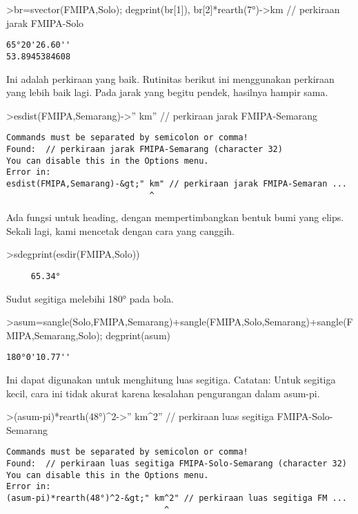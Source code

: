 \documentclass[
]{book}
\begin{document}
\textgreater br=svector(FMIPA,Solo); degprint(br{[}1{]}), br{[}2{]}*rearth(7°)-\textgreater km // perkiraan jarak FMIPA-Solo

\begin{verbatim}
65°20'26.60''
53.8945384608
\end{verbatim}

Ini adalah perkiraan yang baik. Rutinitas berikut ini menggunakan perkiraan yang lebih baik lagi. Pada jarak yang begitu pendek, hasilnya hampir sama.

\textgreater esdist(FMIPA,Semarang)-\textgreater'' km'' // perkiraan jarak FMIPA-Semarang

\begin{verbatim}
Commands must be separated by semicolon or comma!
Found:  // perkiraan jarak FMIPA-Semarang (character 32)
You can disable this in the Options menu.
Error in:
esdist(FMIPA,Semarang)-&gt;" km" // perkiraan jarak FMIPA-Semaran ...
                             ^
\end{verbatim}

Ada fungsi untuk heading, dengan mempertimbangkan bentuk bumi yang elips. Sekali lagi, kami mencetak dengan cara yang canggih.

\textgreater sdegprint(esdir(FMIPA,Solo))

\begin{verbatim}
     65.34°
\end{verbatim}

Sudut segitiga melebihi 180° pada bola.

\textgreater asum=sangle(Solo,FMIPA,Semarang)+sangle(FMIPA,Solo,Semarang)+sangle(FMIPA,Semarang,Solo); degprint(asum)

\begin{verbatim}
180°0'10.77''
\end{verbatim}

Ini dapat digunakan untuk menghitung luas segitiga. Catatan: Untuk segitiga kecil, cara ini tidak akurat karena kesalahan pengurangan dalam asum-pi.

\textgreater(asum-pi)*rearth(48°)\^{}2-\textgreater'' km\^{}2'' // perkiraan luas segitiga FMIPA-Solo-Semarang

\begin{verbatim}
Commands must be separated by semicolon or comma!
Found:  // perkiraan luas segitiga FMIPA-Solo-Semarang (character 32)
You can disable this in the Options menu.
Error in:
(asum-pi)*rearth(48°)^2-&gt;" km^2" // perkiraan luas segitiga FM ...
                                ^
\end{verbatim}
\end{document}
